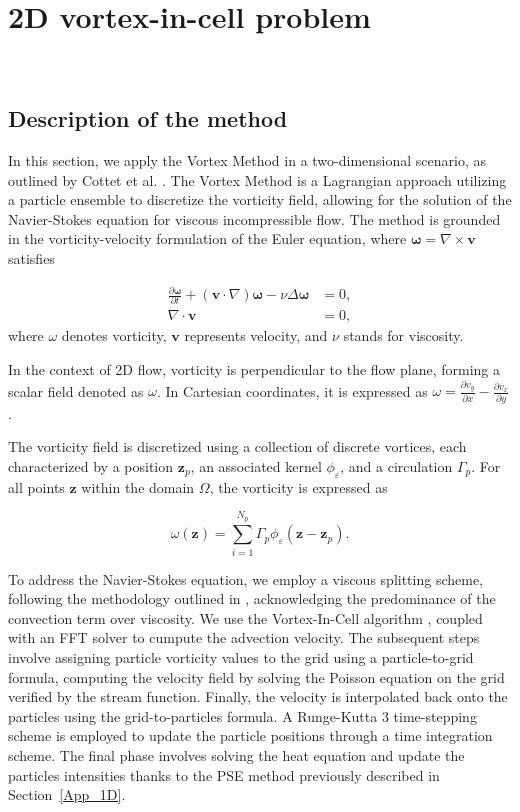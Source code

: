 
\section{2D vortex-in-cell problem}~\label{App_2D}
\subsection{Description of the method}


In this section, we apply the Vortex Method in a two-dimensional scenario, as outlined by Cottet et al. \cite{cottet_vortex_2000}. The Vortex Method is a Lagrangian approach utilizing a particle ensemble to discretize the vorticity field, allowing for the solution of the Navier-Stokes equation for viscous incompressible flow. The method is grounded in the vorticity-velocity formulation of the Euler equation, where $\bm \omega = \nabla \times \bm{v}$ satisfies

\[
	\begin{aligned}
		\frac{\partial \bm \omega}{\partial t} + (\bm{v} \cdot \nabla) \bm \omega - \nu \Delta \bm \omega & = 0, \\
		\nabla \cdot \bm v                                                                                & = 0,
	\end{aligned}
\]where $\omega$ denotes vorticity, $\bm{v}$ represents velocity, and $\nu$ stands for viscosity.

In the context of 2D flow, vorticity is perpendicular to the flow plane, forming a scalar field denoted as $\omega$. In Cartesian coordinates, it is expressed as $\omega = \frac{\partial v_y}{\partial x} - \frac{\partial v_x}{\partial y}$.

The vorticity field is discretized using a collection of discrete vortices, each characterized by a position $\bm z_p$, an associated kernel $\phi_\varepsilon$, and a circulation $\Gamma_p$. For all points $\bm z$ within the domain $\Omega$, the vorticity is expressed as

\begin{equation*}
	\omega(\bm z) = \sum_{i=1}^{N_p} \Gamma_p \phi_\varepsilon(\bm z - \bm z_p).
\end{equation*}

To address the Navier-Stokes equation, we employ a viscous splitting scheme, following the methodology outlined in \cite{cottet_1990}, acknowledging the predominance of the convection term over viscosity. We use the Vortex-In-Cell algorithm \cite{christiansen_1973, birdsall_1969}, coupled with an FFT solver to cumpute the advection velocity. The subsequent steps involve assigning particle vorticity values to the grid using a particle-to-grid formula, computing the velocity field by solving the Poisson equation on the grid verified by the stream function. Finally, the velocity is interpolated back onto the particles using the grid-to-particles formula. A Runge-Kutta 3 time-stepping scheme is employed to update the particle positions through a time integration scheme. The final phase involves solving the heat equation and update the particles intensities thanks to the PSE method previously described in Section~\ref{App_1D}.

